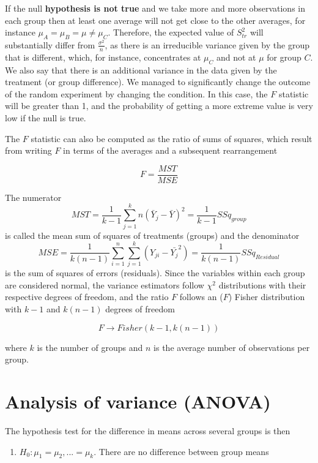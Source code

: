 \documentclass[
]{book}
\providecommand{\tightlist}{%
  \setlength{\itemsep}{0pt}\setlength{\parskip}{0pt}}
\begin{document}
If the null \textbf{hypothesis is not true} and we take more and more observations in each group then at least one average will not get close to the other averages, for instance \(\mu_A=\mu_B=\mu \neq \mu_C\). Therefore, the expected value of \(S^2_{tr}\) will substantially differ from \(\frac{\sigma^2}{n}\), as there is an irreducible variance given by the group that is different, which, for instance, concentrates at \(\mu_C\) and not at \(\mu\) for group \(C\). We also say that there is an additional variance in the data given by the treatment (or group difference). We managed to significantly change the outcome of the random experiment by changing the condition. In this case, the \(F\) statistic will be greater than 1, and the probability of getting a more extreme value is very low if the null is true.

The \(F\) statistic can also be computed as the ratio of sums of squares, which result from writing \(F\) in terms of the averages and a subsequent rearrangement

\[F=\frac{MST}{MSE}\]

The numerator \[MST=\frac{1}{k-1}\sum_{j=1}^k n(\bar{Y}_j-\bar{Y})^2=\frac{1}{k-1}SSq_{group}\] is called the mean sum of squares of treatments (groups) and the denominator \[MSE= \frac{1}{k(n-1)}\sum_{i=1}^n \sum_{j=1}^k (Y_{ji}-\bar{Y_j}^2)=\frac{1}{k(n-1)}SSq_{Residual}\] is the sum of squares of errors (residuals). Since the variables within each group are considered normal, the variance estimators follow \(\chi^2\) distributions with their respective degrees of freedom, and the ratio \(F\) follows an (\(F\)) Fisher distribution with \(k-1\) and \(k(n-1)\) degrees of freedom

\[F \rightarrow Fisher(k-1, k(n-1))\]

where \(k\) is the number of groups and \(n\) is the average number of observations per group.

\hypertarget{analysis-of-variance-anova}{%
\section{Analysis of variance (ANOVA)}\label{analysis-of-variance-anova}}

The hypothesis test for the difference in means across several groups is then

\begin{enumerate}
\def\labelenumi{\alph{enumi}.}
\tightlist
\item
  \(H_0: \mu_1=\mu_2, ...=\mu_k\). There are no difference between group means
\end{enumerate}
\end{document}
